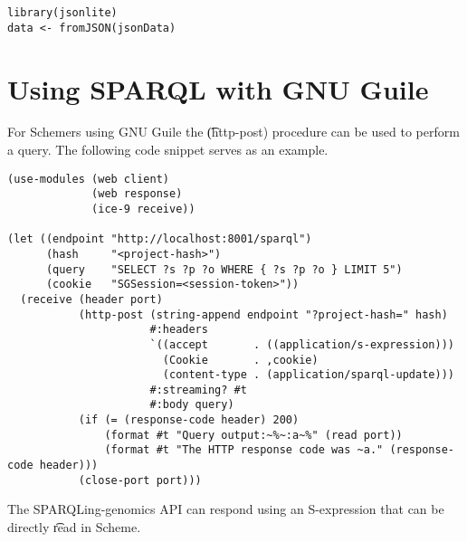 \begin{siderules}
\begin{verbatim}
library(jsonlite)
data <- fromJSON(jsonData)
\end{verbatim}
\end{siderules}

\section{Using SPARQL with GNU Guile}
\label{sec:sparql-with-guile}

  For Schemers using GNU Guile the \t{(http-post)} procedure can be used
  to perform a query.  The following code snippet serves as an example.

\begin{siderules}
\begin{verbatim}
(use-modules (web client)
             (web response)
             (ice-9 receive))

(let ((endpoint "http://localhost:8001/sparql")
      (hash     "<project-hash>")
      (query    "SELECT ?s ?p ?o WHERE { ?s ?p ?o } LIMIT 5")
      (cookie   "SGSession=<session-token>"))
  (receive (header port)
           (http-post (string-append endpoint "?project-hash=" hash)
                      #:headers
                      `((accept       . ((application/s-expression)))
                        (Cookie       . ,cookie)
                        (content-type . (application/sparql-update)))
                      #:streaming? #t
                      #:body query)
           (if (= (response-code header) 200)
               (format #t "Query output:~%~:a~%" (read port))
               (format #t "The HTTP response code was ~a." (response-code header)))
           (close-port port)))
\end{verbatim}
\end{siderules}

  The SPARQLing-genomics API can respond using an S-expression that can be directly
  \t{read} in Scheme.
